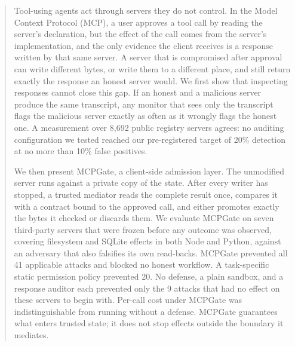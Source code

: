 \begin{abstract}
Tool-using agents act through servers they do not control. In the Model
Context Protocol (MCP), a user approves a tool call by reading the server's
declaration, but the effect of the call comes from the server's implementation,
and the only evidence the client receives is a response written by that same
server. A server that is compromised after approval can write different bytes,
or write them to a different place, and still return exactly the response an
honest server would. We first show that inspecting responses cannot close this
gap. If an honest and a malicious server produce the same transcript, any
monitor that sees only the transcript flags the malicious server exactly as
often as it wrongly flags the honest one. A measurement over 8,692 public
registry servers agrees: no auditing configuration we tested reached our
pre-registered target of 20\% detection at no more than 10\% false positives.

We then present MCPGate, a client-side admission layer. The unmodified server
runs against a private copy of the state. After every writer has stopped, a
trusted mediator reads the complete result once, compares it with a contract
bound to the approved call, and either promotes exactly the bytes it checked or
discards them. We evaluate MCPGate on seven third-party servers that were
frozen before any outcome was observed, covering filesystem and SQLite effects
in both Node and Python, against an adversary that also falsifies its own
read-backs. MCPGate prevented all 41 applicable attacks and blocked no honest
workflow. A task-specific static permission policy prevented 20. No defense, a
plain sandbox, and a response auditor each prevented only the 9 attacks that
had no effect on these servers to begin with. Per-call cost under MCPGate was
indistinguishable from running without a defense. MCPGate guarantees what
enters trusted state; it does not stop effects outside the boundary it
mediates.
\end{abstract}

